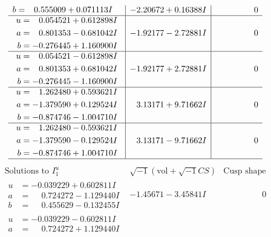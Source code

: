 \documentclass[1p]{elsarticle_modified}
\theoremstyle{definition}
\newcommand{\I}{\sqrt{-1}}
\begin{document}
$$\begin{array}{c|c|c}
\begin{aligned}
b &= \phantom{-}0.555009 + 0.071113 I\end{aligned}
 & -2.20672 + 0.16388 I & \phantom{-0.000000 } 0 \\ \hline\begin{aligned}
u &= \phantom{-}0.054521 + 0.612898 I \\
a &= \phantom{-}0.801353 - 0.681042 I \\
b &= -0.276445 + 1.160900 I\end{aligned}
 & -1.92177 - 2.72881 I & \phantom{-0.000000 } 0 \\ \hline\begin{aligned}
u &= \phantom{-}0.054521 - 0.612898 I \\
a &= \phantom{-}0.801353 + 0.681042 I \\
b &= -0.276445 - 1.160900 I\end{aligned}
 & -1.92177 + 2.72881 I & \phantom{-0.000000 } 0 \\ \hline\begin{aligned}
u &= \phantom{-}1.262480 + 0.593621 I \\
a &= -1.379590 + 0.129524 I \\
b &= -0.874746 - 1.004710 I\end{aligned}
 & \phantom{-}3.13171 + 9.71662 I & \phantom{-0.000000 } 0 \\ \hline\begin{aligned}
u &= \phantom{-}1.262480 - 0.593621 I \\
a &= -1.379590 - 0.129524 I \\
b &= -0.874746 + 1.004710 I\end{aligned}
 & \phantom{-}3.13171 - 9.71662 I & \phantom{-0.000000 } 0\\
 \hline 
 \end{array}$$\newpage$$\begin{array}{c|c|c}  
\text{Solutions to }I^u_{1}& \I (\text{vol} + \sqrt{-1}CS) & \text{Cusp shape}\\
 \hline 
\begin{aligned}
u &= -0.039229 + 0.602811 I \\
a &= \phantom{-}0.724272 - 1.129440 I \\
b &= \phantom{-}0.455629 - 0.132455 I\end{aligned}
 & -1.45671 - 3.45841 I & \phantom{-0.000000 } 0 \\ \hline\begin{aligned}
u &= -0.039229 - 0.602811 I \\
a &= \phantom{-}0.724272 + 1.129440 I \\

\end{aligned}
\end{array}$$
\end{document}
